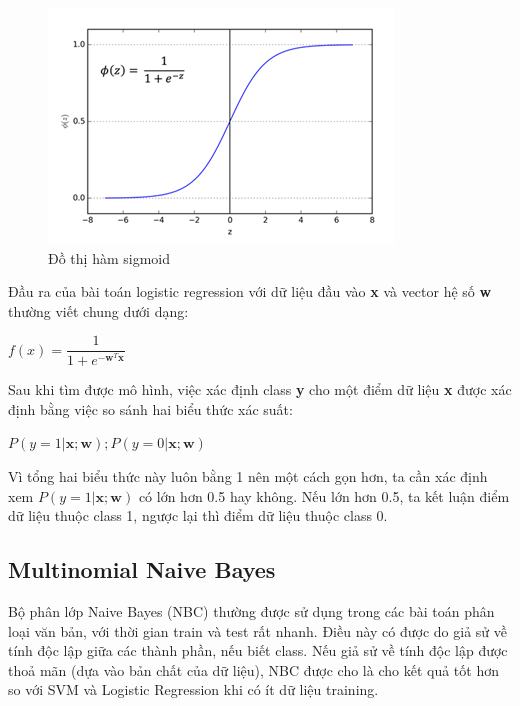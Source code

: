 \documentclass[12pt,a4paper,oneside]{book}
\begin{document}
			\begin{figure}[H]
				\begin{center}
					\includegraphics[width=0.8\columnwidth]{Picture1}
				\end{center}
				\caption{Đồ thị hàm sigmoid}
			\end{figure}
			
			Đầu ra của bài toán logistic regression với dữ liệu đầu vào \textbf{x} và vector hệ số \textbf{w} thường viết chung dưới dạng:
			
			\begin{center}
				$f(x) = \dfrac{1}{1+e^{-\textbf{w}^T\textbf{x}}}$
			\end{center}
			
			Sau khi tìm được mô hình, việc xác định class \textbf{y} cho một điểm dữ liệu \textbf{x} được xác định bằng việc so sánh hai biểu thức xác suất:
			
			\begin{center}
				$P(y=1|\textbf{x};\textbf{w}); P(y=0|\textbf{x};\textbf{w})$
			\end{center}
			
			Vì tổng hai biểu thức này luôn bằng 1 nên một cách gọn hơn, ta cần xác định xem $P(y=1|\textbf{x};\textbf{w})$ có lớn hơn 0.5 hay không. Nếu lớn hơn 0.5, ta kết luận điểm dữ liệu thuộc class 1, ngược lại thì điểm dữ liệu thuộc class 0.
			
		\subsection{Multinomial Naive Bayes}
			Bộ phân lớp Naive Bayes (NBC) thường được sử dụng trong các bài toán phân loại văn bản, với thời gian train và test rất nhanh. Điều này có được do giả sử về tính độc lập giữa các thành phần, nếu biết class. Nếu giả sử về tính độc lập được thoả mãn (dựa vào bản chất của dữ liệu), NBC được cho là cho kết quả tốt hơn so với SVM và Logistic Regression khi có ít dữ liệu training.
\end{document}
